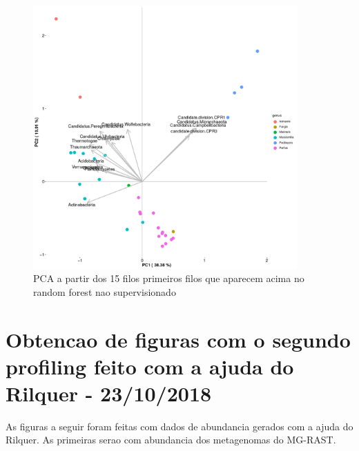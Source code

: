 \documentclass[12pt, a4paper]{report}
\begin{document}
\begin{figure}[H]
  \centering 
  \includegraphics[width=0.9\textwidth]{figures/rf_nao_supervisionado_pca_corais_15_filos_15_10_2018_edited.png}
  \caption{PCA a partir dos 15 filos primeiros filos que aparecem acima no random forest nao supervisionado}
  \end{figure}

\newpage
\section{Obtencao de figuras com o segundo profiling feito com a ajuda do Rilquer - 23/10/2018}  
As figuras a seguir foram feitas com dados de abundancia gerados com a ajuda do Rilquer. As primeiras serao com abundancia dos metagenomas do MG-RAST.
\end{document}
